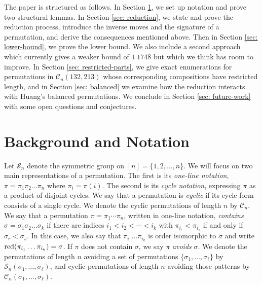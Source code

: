 \documentclass[11pt]{article}
\renewcommand\S{\mathcal S}
\newcommand\C{\mathcal C}
\theoremstyle{definition}
\begin{document}
The paper is structured as follows. In Section \ref{sec: background}, we set up notation and prove two structural lemmas. In Section \ref{sec: reduction}, we state and prove the reduction process, introduce the inverse moves and the signature of a permutation, and derive the consequences mentioned above. Then in Section \ref{sec: lower-bound}, we prove the lower bound. We also include a second approach which currently gives a weaker bound of $1.1748$ but which we think has room to improve. In Section \ref{sec: restricted-parts}, we give exact enumerations for permutations in $\C_n(132,213)$ whose corresponding compositions have restricted length, and in Section \ref{sec: balanced} we examine how the reduction interacts with Huang's balanced permutations. We conclude in Section \ref{sec: future-work} with some open questions and conjectures.

\section{Background and Notation} \label{sec: background}

Let $\S_n$ denote the symmetric group on $[n] = \{1,2,\dots,n\}$. We will focus on two main representations of a permutation. The first is its \textit{one-line notation}, $\pi = \pi_1\pi_2 \ldots \pi_n$ where $\pi_i = \pi(i)$. The second is its \emph{cycle notation}, expressing $\pi$ as a product of disjoint cycles. We say that a permutation is \emph{cyclic} if its cycle form consists of a single cycle. We denote the cyclic permutations of length $n$ by $\C_n$. We say that a permutation $\pi = \pi_1\cdots\pi_n$, written in one-line notation, \emph{contains} $\sigma = \sigma_1\sigma_2\ldots \sigma_k$ if there are indices $i_1 < i_2 < \cdots < i_k$ with $\pi_{i_r} < \pi_{i_s}$ if and only if $\sigma_r < \sigma_s$. In this case, we also say that $\pi_{i_1}\ldots \pi_{i_k}$ is order isomorphic to $\sigma$ and write ${\rm red}(\pi_{i_1}\ldots \pi_{i_k}) = \sigma$. If $\pi$ does not contain $\sigma$, we say $\pi$ \emph{avoids} $\sigma$. We denote the permutations of length $n$ avoiding a set of permutations $\{\sigma_1,\dots,\sigma_\ell\}$ by $\S_n(\sigma_1,\dots,\sigma_\ell)$, and cyclic permutations of length $n$ avoiding those patterns by $\C_n(\sigma_1,\dots,\sigma_\ell)$. 
\end{document}
